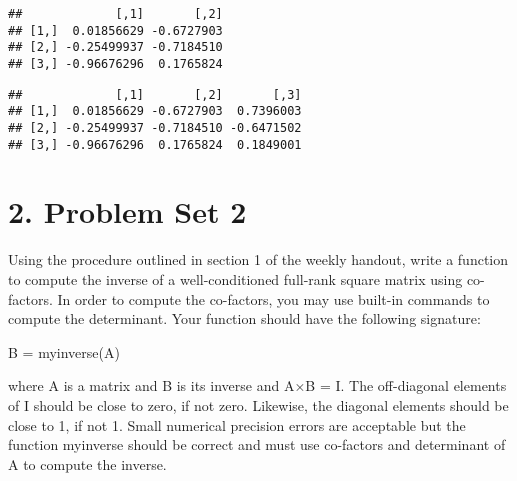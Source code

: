 \documentclass[]{article}
\newenvironment{Shaded}{\begin{snugshade}}{\end{snugshade}}
\newcommand{\KeywordTok}[1]{\textcolor[rgb]{0.13,0.29,0.53}{\textbf{{#1}}}}
\newcommand{\DataTypeTok}[1]{\textcolor[rgb]{0.13,0.29,0.53}{{#1}}}
\newcommand{\DecValTok}[1]{\textcolor[rgb]{0.00,0.00,0.81}{{#1}}}
\newcommand{\StringTok}[1]{\textcolor[rgb]{0.31,0.60,0.02}{{#1}}}
\newcommand{\NormalTok}[1]{{#1}}
\begin{document}
\begin{Shaded}
\end{Shaded}

\begin{verbatim}
##             [,1]       [,2]
## [1,]  0.01856629 -0.6727903
## [2,] -0.25499937 -0.7184510
## [3,] -0.96676296  0.1765824
\end{verbatim}

\begin{Shaded}
\end{Shaded}

\begin{verbatim}
##             [,1]       [,2]       [,3]
## [1,]  0.01856629 -0.6727903  0.7396003
## [2,] -0.25499937 -0.7184510 -0.6471502
## [3,] -0.96676296  0.1765824  0.1849001
\end{verbatim}

\section{2. Problem Set 2}\label{problem-set-2}

Using the procedure outlined in section 1 of the weekly handout, write a
function to compute the inverse of a well-conditioned full-rank square
matrix using co-factors. In order to compute the co-factors, you may use
built-in commands to compute the determinant. Your function should have
the following signature:

B = myinverse(A)

where A is a matrix and B is its inverse and A×B = I. The off-diagonal
elements of I should be close to zero, if not zero. Likewise, the
diagonal elements should be close to 1, if not 1. Small numerical
precision errors are acceptable but the function myinverse should be
correct and must use co-factors and determinant of A to compute the
inverse.
\end{document}

